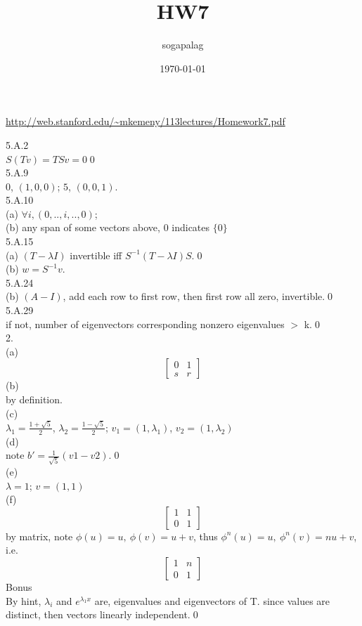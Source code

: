 \documentclass[paper=a4, fontsize=11pt]{scrartcl} %
\title{HW7}
\author{sogapalag}
\date{\normalsize\today}
\numberwithin{equation}{section} %
\numberwithin{figure}{section} %
\numberwithin{table}{section} %
\begin{document}
\maketitle 
\url{http://web.stanford.edu/~mkemeny/113lectures/Homework7.pdf}

5.A.2\\
$S(Tv)= TSv=0$\qed\\
5.A.9\\
$0$, $(1,0,0)$; $5$, $(0,0,1)$.\\
5.A.10\\
(a) $\forall i, (0,..,i,..,0)$;\\
(b) any span of some vectors above, 0 indicates $\{0\}$\\
5.A.15\\
(a) $(T-\lambda I)$ invertible iff $S^{-1}(T-\lambda I)S$.\qed\\
(b) $w=S^{-1}v$.\\
5.A.24\\
(b) $(A-I)$, add each row to first row, then first row all zero, invertible.\qed\\
5.A.29\\
if not, number of eigenvectors corresponding nonzero eigenvalues $>$ k.\qed\\

2.\\
(a)\begin{equation}
\begin{bmatrix}
	0 & 1 \\
	s & r
\end{bmatrix}
\end{equation}
(b)\\
by definition.\\
(c)\\
 $\lambda_1 = \frac{1+\sqrt{5}}{2}$, $\lambda_2 = \frac{1-\sqrt{5}}{2}$; $v_1=(1, \lambda_1)$, $v_2=(1, \lambda_2)$\\
(d)\\
 note $b'=\frac{1}{\sqrt{5}}(v1-v2)$.\qed\\
 (e)\\
 $\lambda=1$; $v=(1,1)$\\
 (f)\begin{equation}
\begin{bmatrix}
	1 & 1 \\
	0 & 1
\end{bmatrix}
\end{equation}
by matrix, note $\phi(u)=u,\ \phi(v)=u+v$, thus $\phi^n(u)=u,\ \phi^n(v)=nu+v$, i.e.
\begin{equation}
\begin{bmatrix}
	1 & n \\
	0 & 1
\end{bmatrix}
\end{equation}
Bonus\\
By hint, $\lambda_i$ and $e^{\lambda_1 x}$ are, eigenvalues and eigenvectors of T. since values are distinct, then vectors linearly independent.\qed 
\end{document}
